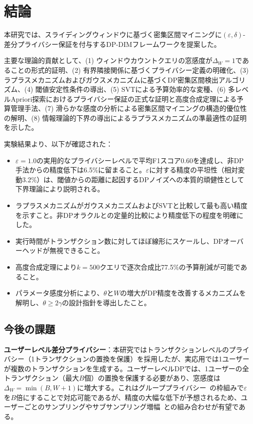 \section{結論}\label{sec:conclusion}

本研究では、スライディングウィンドウに基づく密集区間マイニングに$(\varepsilon, \delta)$-差分プライバシー保証を付与するDP-DIMフレームワークを提案した。

主要な理論的貢献として、(1) ウィンドウカウントクエリの窓感度が$\Delta_W = 1$であることの形式的証明、(2) 有界隣接関係に基づくプライバシー定義の明確化、(3) ラプラスメカニズムおよびガウスメカニズムに基づくDP密集区間検出アルゴリズム、(4) 閾値安定性条件の導出、(5) SVTによる予算効率的な変種、(6) 多レベルApriori探索におけるプライバシー保証の正式な証明と高度合成定理による予算管理手法、(7) 滑らかな感度の分析による密集区間マイニングの構造的優位性の解明、(8) 情報理論的下界の導出によるラプラスメカニズムの準最適性の証明を示した。

実験結果より、以下が確認された：
\begin{itemize}
  \item $\varepsilon = 1.0$の実用的なプライバシーレベルで平均F1スコア0.60を達成し、非DP手法からの精度低下は6.5\%に留まること。$\varepsilon$に対する精度の平坦性（相対変動3.2\%）は、閾値からの距離に起因するDPノイズへの本質的頑健性として下界理論により説明される。
  \item ラプラスメカニズムがガウスメカニズムおよびSVTと比較して最も高い精度を示すこと。非DPオラクルとの定量的比較により精度低下の程度を明確にした。
  \item 実行時間がトランザクション数に対してほぼ線形にスケールし、DPオーバーヘッドが無視できること。
  \item 高度合成定理により$k = 500$クエリで逐次合成比77.5\%の予算削減が可能であること。
  \item パラメータ感度分析により、$\theta$と$W$の増大がDP精度を改善するメカニズムを解明し、$\theta \geq 2\gamma$の設計指針を導出したこと。
\end{itemize}

\subsection{今後の課題}

\textbf{ユーザーレベル差分プライバシー}：本研究ではトランザクションレベルのプライバシー（1トランザクションの置換を保護）を採用したが、実応用では1ユーザーが複数のトランザクションを生成する。ユーザーレベルDPでは、1ユーザーの全トランザクション（最大$B$個）の置換を保護する必要があり、窓感度は$\Delta_W = \min(B, W+1)$に増大する。これはグループプライバシー~\cite{dwork2014algorithmic}の枠組みで$\varepsilon$を$B$倍にすることで対応可能であるが、精度の大幅な低下が予想されるため、ユーザーごとのサンプリングやサブサンプリング増幅~\cite{balle2018privacy}との組み合わせが有望である。

